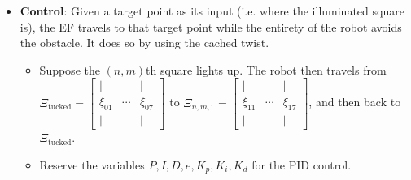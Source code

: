 \documentclass{article}
\begin{document}
\begin{itemize}
    \item \textbf{Control}: Given a target point as its input (i.e. where the illuminated square is), the EF travels to that target point while the entirety of the robot avoids the obstacle. It does so by using the cached twist.
    \begin{itemize}
        \item Suppose the $(n, m)$th square lights up. The robot then travels from $\Xi_\text{tucked} = \begin{bmatrix}
            | & & |\\
            \xi_{01} & \cdots & \xi_{07}\\
            |&&|
        \end{bmatrix}$ to $\Xi_{n,m,:} = \begin{bmatrix}
            | & & |\\
            \xi_{11} & \cdots & \xi_{17}\\
            |&&|
        \end{bmatrix}$, and then back to $\Xi_\text{tucked}$.
        \item Reserve the variables $P, I, D, e, K_p, K_i, K_d$ for the PID control.
    \end{itemize}
\end{itemize}
\end{document}

